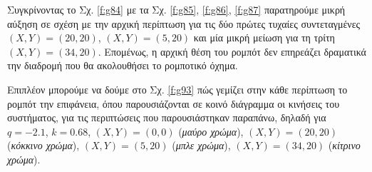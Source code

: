 Συγκρίνοντας το Σχ. \ref{f:g84} με τα Σχ. \ref{f:g85}, \ref{f:g86}, \ref{f:g87} παρατηρούμε μικρή αύξηση σε σχέση με την αρχική περίπτωση για τις δύο πρώτες τυχαίες συντεταγμένες $(X,Y) = (20,20)$, $(X,Y) = (5,20)$ και μία μικρή μείωση για τη τρίτη $(X,Y) = (34,20)$. Επομένως, η αρχική θέση του ρομπότ δεν επηρεάζει δραματικά την διαδρομή που θα ακολουθήσει το ρομποτικό όχημα.

Επιπλέον μπορούμε να δούμε στο Σχ. \ref{f:g93} πώς γεμίζει στην κάθε περίπτωση το ρομπότ την επιφάνεια, όπου παρουσιάζονται σε κοινό διάγραμμα οι κινήσεις του συστήματος, για τις περιπτώσεις που παρουσιάστηκαν παραπάνω, δηλαδή για $q = -2.1$, $k = 0.68$, $(X,Y) = (0,0)$ (\emph{μαύρο χρώμα}), $(X,Y) = (20,20)$ (\emph{κόκκινο χρώμα}), $(X,Y) = (5,20)$ (\emph{μπλε χρώμα}), $(X,Y) = (34,20)$ (\emph{κίτρινο χρώμα}).


